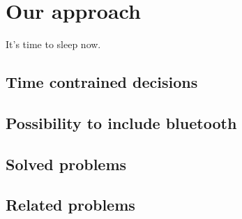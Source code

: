 {\color{PineGreen}\section{Our approach}}
It's time to sleep now. 
{\color{PineGreen}\subsection{Time contrained decisions}}

{\color{PineGreen}\subsection{Possibility to include bluetooth}}
{\color{PineGreen}\subsection{Solved problems}}

{\color{PineGreen}\subsection{Related problems}}

